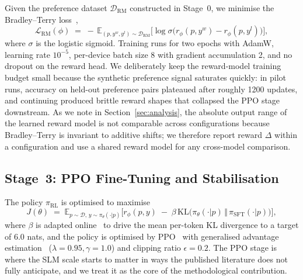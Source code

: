 \documentclass[10pt,twocolumn,letterpaper]{article}
\begin{document}
Given the preference dataset $\mathcal{D}_\text{RM}$ constructed in Stage~0, we minimise the Bradley--Terry loss~\cite{bradley1952rank},
\begin{equation}
  \mathcal{L}_\text{RM}(\phi) \;=\; -\,\mathbb{E}_{(p,y^{w},y^{l})\sim\mathcal{D}_{\text{RM}}}\!\Big[\log \sigma\!\big(r_\phi(p,y^{w})-r_\phi(p,y^{l})\big)\Big],
  \label{eq:rm}
\end{equation}
where $\sigma$ is the logistic sigmoid. Training runs for two epochs with AdamW, learning rate $10^{-5}$, per-device batch size 8 with gradient accumulation 2, and no dropout on the reward head. We deliberately keep the reward-model training budget small because the synthetic preference signal saturates quickly: in pilot runs, accuracy on held-out preference pairs plateaued after roughly 1200 updates, and continuing produced brittle reward shapes that collapsed the PPO stage downstream. As we note in Section~\ref{sec:analysis}, the absolute output range of the learned reward model is not comparable across configurations because Bradley--Terry is invariant to additive shifts; we therefore report reward $\Delta$ within a configuration and use a shared reward model for any cross-model comparison.

\subsection{Stage~3: PPO Fine-Tuning and Stabilisation}
\label{sec:ppo}

The policy $\pi_{\text{RL}}$ is optimised to maximise
\begin{equation}
  J(\theta) \;=\; \mathbb{E}_{p\sim\mathcal{D},\,y\sim\pi_{\theta}(\cdot|p)}\!\Big[r_\phi(p,y)\;-\;\beta\,\mathrm{KL}\!\big(\pi_{\theta}(\cdot|p)\,\Vert\,\pi_{\text{SFT}}(\cdot|p)\big)\Big],
  \label{eq:ppo_obj}
\end{equation}
where $\beta$ is adapted online~\cite{ziegler2019fine} to drive the mean per-token KL divergence to a target of $6.0$ nats, and the policy is optimised by PPO~\cite{schulman2017proximal} with generalised advantage estimation~\cite{schulman2015high} ($\lambda=0.95,\gamma=1.0$) and clipping ratio $\epsilon=0.2$. The PPO stage is where the SLM scale starts to matter in ways the published literature does not fully anticipate, and we treat it as the core of the methodological contribution.
\end{document}
